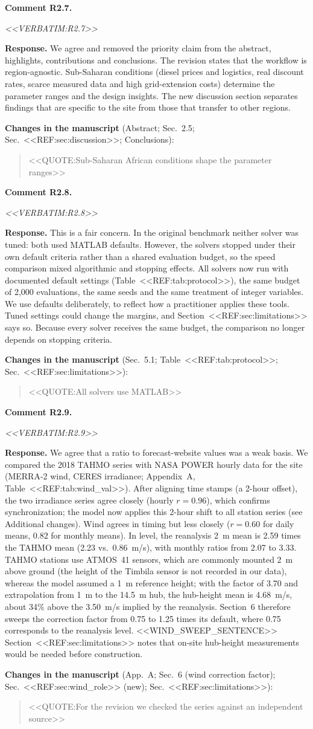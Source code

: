 \documentclass[11pt]{article}
\newcounter{rc}
\newcommand{\rcomment}[2]{\stepcounter{rc}\par\medskip
  \noindent\textbf{Comment #1.}\par
  {\color{commentgrey}\itshape #2\par}}
\newcommand{\response}[1]{\par\noindent\textbf{Response.} #1\par}
\newcommand{\change}[2]{\par\noindent\textbf{Changes in the manuscript} (#1):\par
  \begin{quote}\color{revblue}#2\end{quote}}
\begin{document}
\rcomment{R2.7}{<<VERBATIM:R2.7>>}
\response{We agree and removed the priority claim from the abstract, highlights, contributions and conclusions. The revision states that the workflow is region-agnostic. Sub-Saharan conditions (diesel prices and logistics, real discount rates, scarce measured data and high grid-extension costs) determine the parameter ranges and the design insights. The new discussion section separates findings that are specific to the site from those that transfer to other regions.}
\change{Abstract; Sec.~2.5; Sec.~<<REF:sec:discussion>>; Conclusions}{<<QUOTE:Sub-Saharan African conditions shape the parameter ranges>>}

\rcomment{R2.8}{<<VERBATIM:R2.8>>}
\response{This is a fair concern. In the original benchmark neither solver was tuned: both used MATLAB defaults. However, the solvers stopped under their own default criteria rather than a shared evaluation budget, so the speed comparison mixed algorithmic and stopping effects. All solvers now run with documented default settings (Table~<<REF:tab:protocol>>), the same budget of 2,000 evaluations, the same seeds and the same treatment of integer variables. We use defaults deliberately, to reflect how a practitioner applies these tools. Tuned settings could change the margins, and Section~<<REF:sec:limitations>> says so. Because every solver receives the same budget, the comparison no longer depends on stopping criteria.}
\change{Sec.~5.1; Table~<<REF:tab:protocol>>; Sec.~<<REF:sec:limitations>>}{<<QUOTE:All solvers use MATLAB>>}

\rcomment{R2.9}{<<VERBATIM:R2.9>>}
\response{We agree that a ratio to forecast-website values was a weak basis. We compared the 2018 TAHMO series with NASA POWER hourly data for the site (MERRA-2 wind, CERES irradiance; Appendix~A, Table~<<REF:tab:wind_val>>). After aligning time stamps (a 2-hour offset), the two irradiance series agree closely (hourly $r=0.96$), which confirms synchronization; the model now applies this 2-hour shift to all station series (see Additional changes). Wind agrees in timing but less closely ($r=0.60$ for daily means, $0.82$ for monthly means). In level, the reanalysis 2~m mean is 2.59 times the TAHMO mean (2.23 vs.\ 0.86~m/s), with monthly ratios from 2.07 to 3.33. TAHMO stations use ATMOS~41 sensors, which are commonly mounted 2~m above ground (the height of the Timbila sensor is not recorded in our data), whereas the model assumed a 1~m reference height; with the factor of 3.70 and extrapolation from 1~m to the 14.5~m hub, the hub-height mean is 4.68~m/s, about 34\% above the 3.50~m/s implied by the reanalysis. Section~6 therefore sweeps the correction factor from 0.75 to 1.25 times its default, where 0.75 corresponds to the reanalysis level. <<WIND_SWEEP_SENTENCE>> Section~<<REF:sec:limitations>> notes that on-site hub-height measurements would be needed before construction.}
\change{App.~A; Sec.~6 (wind correction factor); Sec.~<<REF:sec:wind_role>> (new); Sec.~<<REF:sec:limitations>>}{<<QUOTE:For the revision we checked the series against an independent source>>}
\end{document}
